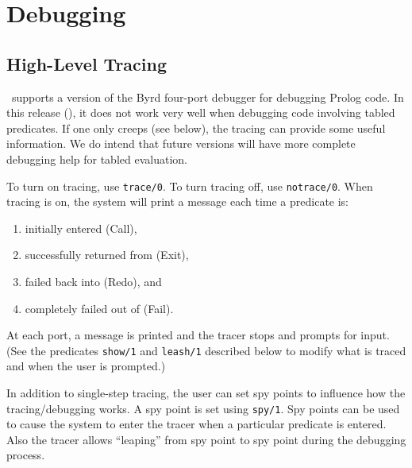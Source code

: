 \chapter{Debugging} \label{debugging}

\section{High-Level Tracing}

\ourprolog\ supports a version of the Byrd four-port debugger for debugging
Prolog code.  In this release (\version), it does not work very well
when debugging code involving tabled predicates.  If one only creeps
(see below), the tracing can provide some useful information.  We do
intend that future versions will have more complete debugging help for
tabled evaluation.

To turn on tracing, use {\tt trace/0}.  To turn tracing off, use 
{\tt notrace/0}.  When tracing is on, the system will print a message each
time a predicate is:
\begin{enumerate} 
\item initially entered (Call), 
\item successfully returned from (Exit), 
\item failed back into (Redo), and
\item completely failed out of (Fail).  
\end{enumerate}
At each port, a message is printed and the tracer stops and prompts
for input.  (See the predicates {\tt show/1} and {\tt leash/1} described
below to modify what is traced and when the user is prompted.)

In addition to single-step tracing, the user can set spy points to influence
how the tracing/debugging works.  A spy point is set using {\tt spy/1}.
Spy points can be used to cause the system to enter the tracer when
a particular predicate is entered. Also the tracer allows ``leaping'' from
spy point to spy point during the debugging process.

